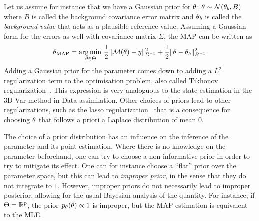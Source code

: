 \documentclass[../../Main_ManuscritThese.tex]{subfiles}
\begin{document}
Let us assume for instance that we have a Gaussian prior for $\theta$:
$\theta \sim \mathcal{N}(\theta_{b},B)$ where $B$ is called the
background covariance error matrix and $\theta_b$ is called the
\emph{background value} that acts as a plausible reference
value. Assuming a Gaussian form for the errors as well with covariance
matrix $\Sigma$, the MAP can be written as
\begin{equation}
  {\theta}_{\mathrm{MAP}} = \operatorname*{arg\,min \,}_{\theta \in \Theta} \frac{1}{2}\| \mathcal{M}(\theta) - y\|^2_{\Sigma^{-1}} + \frac{1}{2}\|\theta - \theta_b\|^2_{B^{-1}}
\end{equation}
Adding a Gaussian prior for the parameter comes down to adding a $L^2$
regularization term to the optimisation problem, also called Tikhonov
regularization~\citep{tikhonov_solutions_1977}. This expression is very
analoguous to the state estimation in the 3D-Var method in Data
assimilation.  Other choices of priors lead to other regularizations,
such as the lasso regularization~\citep{tibshirani_regression_2011}
that is a consequence for choosing $\theta$ that follows a priori a
Laplace distribution of mean $0$.

The choice of a prior distribution has an influence on the inference
of the parameter and its point estimation. Where there is no knowledge
on the parameter beforehand, one can try to choose a non-informative
prior in order to try to mitigate its effect. One can for instance
choose a ``flat'' prior over the parameter space, but this can lead to
\emph{improper prior}, in the sense that they do not integrate to
$1$. However, improper priors do not necessarily lead to improper
posterior, allowing for the usual Bayesian analysis of the
quantity. For instance, if $\Theta=\mathbb{R}^p$, the prior
$p_{\theta}(\theta) \propto 1$ is improper, but the MAP estimation is
equivalent to the MLE.

\end{document}
